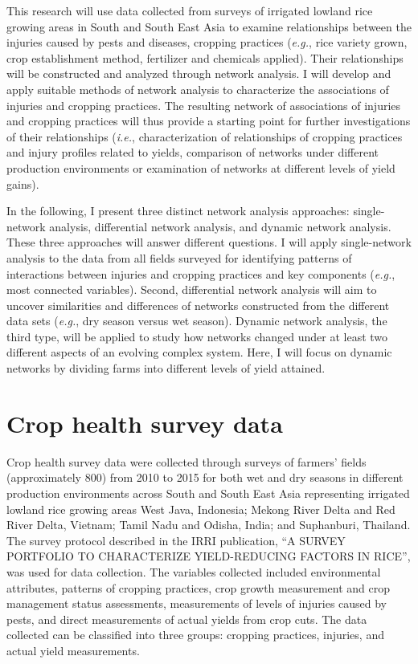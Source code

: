 \thispagestyle{empty}
This research will use data collected from surveys of irrigated lowland rice growing areas in South and South East Asia to examine relationships between the injuries caused by pests and diseases, cropping practices (\textit{e.g.}, rice variety grown, crop establishment method, fertilizer and chemicals applied). Their relationships will be constructed and analyzed through network analysis. I will develop and apply suitable methods of network analysis to characterize the associations of injuries and cropping practices. The resulting network of associations of injuries and cropping practices will thus provide a starting point for further investigations of their relationships (\textit{i.e.}, characterization of relationships of cropping practices and injury profiles related to yields, comparison of networks under different production environments or examination of networks at different levels of yield gains). 

In the following, I present three distinct network analysis approaches: single-network analysis, differential network analysis, and dynamic network analysis. These three approaches will answer different questions. I will apply single-network analysis to the data from all fields surveyed for identifying patterns of interactions between injuries and cropping practices and key components (\textit{e.g.}, most connected variables). Second, differential network analysis will aim to uncover similarities and differences of networks constructed from the different data sets (\textit{e.g.}, dry season versus wet season). Dynamic network analysis, the third type, will be applied to study how networks changed under at least two different aspects of an evolving complex system. Here, I will focus on dynamic networks by dividing farms into different levels of yield attained. 

\section*{Crop health survey data}

Crop health survey data were collected through surveys of farmers' fields (approximately 800) from 2010 to 2015 for both wet and dry seasons in different production environments across South and South East Asia representing irrigated lowland rice growing areas West Java, Indonesia; Mekong River Delta and Red River Delta, Vietnam; Tamil Nadu and Odisha, India; and Suphanburi, Thailand. The survey protocol described in the IRRI publication, ``A SURVEY PORTFOLIO TO CHARACTERIZE YIELD-REDUCING FACTORS IN RICE'', \citep{Savarysurvey2009} was used for data collection. The variables collected included environmental attributes, patterns of cropping practices, crop growth measurement and crop management status assessments, measurements of levels of injuries caused by pests, and direct measurements of actual yields from crop cuts. The data collected can be classified into three groups: cropping practices, injuries, and actual yield measurements.

